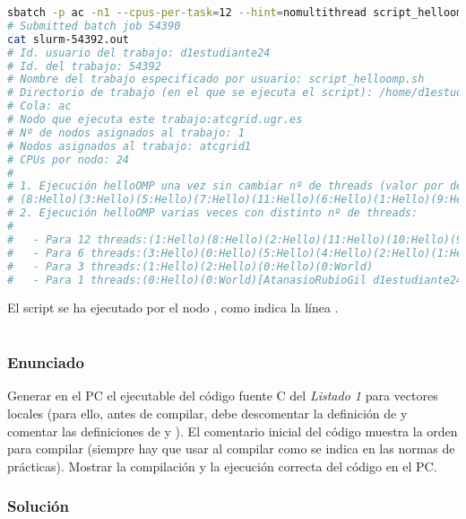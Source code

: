 \begin{lstlisting}[language=sh]
sbatch -p ac -n1 --cpus-per-task=12 --hint=nomultithread script_helloomp.sh
# Submitted batch job 54390
cat slurm-54392.out
# Id. usuario del trabajo: d1estudiante24
# Id. del trabajo: 54392
# Nombre del trabajo especificado por usuario: script_helloomp.sh
# Directorio de trabajo (en el que se ejecuta el script): /home/d1estudiante24/bp0/ejer3
# Cola: ac
# Nodo que ejecuta este trabajo:atcgrid.ugr.es
# Nº de nodos asignados al trabajo: 1
# Nodos asignados al trabajo: atcgrid1
# CPUs por nodo: 24
#
# 1. Ejecución helloOMP una vez sin cambiar nº de threads (valor por defecto):
# (8:Hello)(3:Hello)(5:Hello)(7:Hello)(11:Hello)(6:Hello)(1:Hello)(9:Hello)(4:Hello)(0:Hello)(2:Hello)(10:Hello)(0:World)
# 2. Ejecución helloOMP varias veces con distinto nº de threads:
#
#   - Para 12 threads:(1:Hello)(8:Hello)(2:Hello)(11:Hello)(10:Hello)(9:Hello)(0:Hello)(7:Hello)(5:Hello)(4:Hello)(6:Hello)(3:Hello)(0:World)
#   - Para 6 threads:(3:Hello)(0:Hello)(5:Hello)(4:Hello)(2:Hello)(1:Hello)(0:World)
#   - Para 3 threads:(1:Hello)(2:Hello)(0:Hello)(0:World)
#   - Para 1 threads:(0:Hello)(0:World)[AtanasioRubioGil d1estudiante24@atcgrid:~/bp0/ejer3] 2020-06-11 jueves
\end{lstlisting}

El script se ha ejecutado por el nodo , como indica la línea .

\pagebreak

\section{}\label{ej1-5}

\subsubsection{Enunciado}

Generar en el PC el ejecutable del código fuente C del \textit{Listado 1} para vectores locales (para ello, antes de compilar, debe descomentar la definición de  y comentar las definiciones de  y ).
El comentario inicial del código muestra la orden para compilar (siempre hay que usar  al compilar como se indica en las normas de prácticas).
Mostrar la compilación y la ejecución correcta del código en el PC\@.

\subsubsection{Solución}

